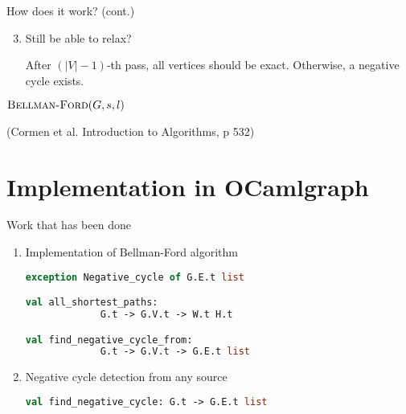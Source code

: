 \documentclass{beamer}
\begin{document}
\begin{frame}{How does it work? (cont.)}

\begin{enumerate}
\setcounter{enumi}{2}

\item \alert{Still be able to relax?}

After $(|V|-1)$-th pass, all vertices should be exact.
Otherwise, a negative cycle exists.

\end{enumerate}

\end{frame}

\begin{frame}{$\mbox{\sc Bellman-Ford}(G,s,l)$}

\begin{algorithmic}[1]
\ENDFOR
\ENDFOR
{}
\ENDIF
\ENDFOR
{}
\end{algorithmic}

(Cormen et al. Introduction to Algorithms, p 532)

\end {frame}

\section{Implementation in OCamlgraph}
\frame{\sectionpage}

\begin{frame}[fragile]{Work that has been done}

\begin{enumerate}
\item Implementation of Bellman-Ford algorithm

\begin{lstlisting}[language=Ocaml]
exception Negative_cycle of G.E.t list

val all_shortest_paths:
             G.t -> G.V.t -> W.t H.t

val find_negative_cycle_from:
             G.t -> G.V.t -> G.E.t list
\end{lstlisting} \vspace*{10pt}

\pause
\item Negative cycle detection from any source

\begin{lstlisting}[language=Ocaml]
val find_negative_cycle: G.t -> G.E.t list
\end{lstlisting}

\end{enumerate}

\end{frame}
\end{document}
